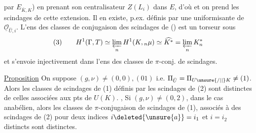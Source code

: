 par $E_{\bar K,K}$) en prenant son centralisateur $Z(L_i)$ dans $E$, d'où
et on prend les scindages de cette extension. Il en existe, p.ex. définis par une uniformisante de $\underline{\mathcal O}_{\widehat U,i}$. L'ens des classes de conjugaison des  scindages  de () est un torseur sous 
\[
(3)\qquad H^1(\Gamma,T)\simeq\varprojlim_n H^1(K,{}_n\mu)\simeq\widehat{K^*}=\varprojlim_n K^*_n
\]
et  s'envoie injectivement  dans l'ens des classes de $\pi$-conj. de scindages.

\uline{Proposition} On suppose $(g,\nu)\ne(0,0),(01)$ i.e. $\Pi_{\bar U}=\Pi_{U\unsure{/|\mid}K}\ne(1)$. Alors les classes de  scindages  de (1) définis par les scindages de (2) sont distinctes de celles associées aux pts de $U(K)$. , Si  $(g,\nu)\ne(0,2)$,   dans le cas anabélien, alors les classes de $\pi$-conjugaison de scindages de (1), associés à des scindages de (2) pour deux indices $i\deleted{\unsure{a}}=i_1$ et $i=i_2$ distincts\unsure{,} sont distinctes.
